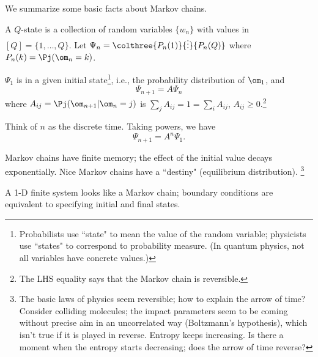 We summarize some basic facts about Markov chains.
\begin{df}
A $Q$-state  is a collection of random variables $\{w_n\}$ with values in $[Q]=\{1,\ldots, Q\}$. Let $\Psi_n = \colthree{P_n(1)}{\vdots}{P_n(Q)}$ where $P_n(k) = \Pj(\om_n=k)$.

$\Psi_1$ is in a given initial state\footnote{Probabilists use ``state" to mean the value of the random variable; physicists use ``states" to correspond to probability measure. (In quantum physics, not all variables have concrete values.)}, i.e., the probability distribution of $\om_1$, and 
\[
\Psi_{n+1} = A\Psi_n
\]
where $A_{ij}=\Pj(\om_{n+1}|\om_n=j)$ is  $\sum_{j}A_{ij} = 1 = \sum_i A_{ij}$, $A_{ij}\ge 0$.\footnote{The LHS equality says that the Markov chain is reversible.}
\end{df}
Think of $n$ as the discrete time.
Taking powers, we have
\[
\Psi_{n+1} = A^n \Psi_1.
\]

Markov chains have finite memory; the effect of the initial value decays exponentially.
Nice Markov chains have a ``destiny" (equilibrium distribution). 
\footnote{The basic laws of physics seem reversible; how to explain the arrow of time? Consider colliding molecules; the impact parameters seem to be coming without precise aim in an uncorrelated way (Boltzmann's hypothesis), which isn't true if it is played in reverse. Entropy keeps increasing. Is there a moment when the entropy starts decreasing; does the arrow of time reverse?}

A 1-D finite system looks like a Markov chain; boundary conditions are equivalent to specifying initial and final states.

